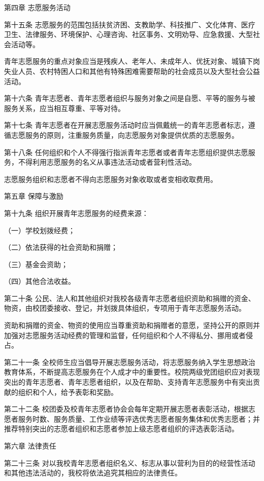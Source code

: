 \documentclass[UTF8,12pt,a4paper]{report}
\begin{document}
 

第四章  志愿服务活动

第十五条 志愿服务的范围包括扶贫济困、支教助学、科技推广、文化体育、医疗卫生、法律服务、环境保护、心理咨询、社区事务、文明劝导、应急救援、大型社会活动等。

青年志愿服务的重点对象应当是残疾人、老年人、未成年人、优抚对象、城镇下岗失业人员、农村特困人口和其他有特殊困难需要帮助的社会成员以及大型社会公益活动。

第十六条 青年志愿者、青年志愿者组织与服务对象之间是自愿、平等的服务与被服务关系，应当相互尊重、平等对待。

第十七条 青年志愿者在开展志愿服务活动时应当佩戴统一的青年志愿者标志，遵循志愿服务的原则，注重服务质量，向志愿服务对象提供优质的志愿服务。

第十八条 任何组织和个人不得强行指派青年志愿者或者青年志愿组织提供志愿服务，不得利用志愿服务的名义从事违法活动或者营利性活动。

志愿服务组织和志愿者不得向志愿服务对象收取或者变相收取费用。

 

第五章  保障与激励

第十九条 组织开展青年志愿服务的经费来源：

（一）学校划拨经费；

（二）依法获得的社会资助和捐赠；

（三）基金会资助；

（四）其他合法收益。

第二十条 公民、法人和其他组织对我校各级青年志愿者组织资助和捐赠的资金、物资，由校团委接收、登记，并划拨具体组织，专项用于青年志愿服务活动。

资助和捐赠的资金、物资的使用应当尊重资助和捐赠者的意愿，坚持公开的原则并加强对志愿服务活动经费的管理和监督，任何组织和个人不得私分、挪用或者侵占。

第二十一条 全校师生应当倡导开展志愿服务活动，将志愿服务纳入学生思想政治教育体系，不断提高志愿服务在个人成才中的重要性。校院两级党团组织应对表现突出的青年志愿者、青年志愿者组织，以及在帮助、支持青年志愿服务中有突出贡献的组织和个人，给予表彰和奖励。

第二十二条 校团委及校青年志愿者协会会每年定期开展志愿者表彰活动，根据志愿者服务时数、服务质量、工作业绩等评选优秀志愿者服务集体和优秀志愿者；并推荐特别突出的志愿者组织和志愿者参加上级志愿者组织的评选表彰活动。

 

第六章  法律责任

第二十三条 对以我校青年志愿者组织名义、标志从事以营利为目的的经营性活动和其他违法活动的，我校将依法追究其相应的法律责任。
\end{document}
